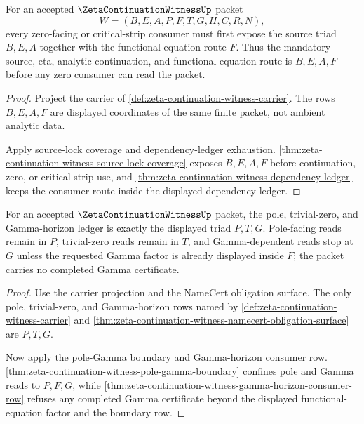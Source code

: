 \begin{theorem}
\label{thm:zeta-continuation-witness-source-lock-triad}
For an accepted $\ZetaContinuationWitnessUp$ packet
$$
W=(B,E,A,P,F,T,G,H,C,R,N),
$$
every zero-facing or critical-strip consumer must first expose the source triad $B,E,A$ together with the functional-equation route $F$. Thus the mandatory source, eta, analytic-continuation, and functional-equation route is $B,E,A,F$ before any zero consumer can read the packet.
\end{theorem}
\begin{proof}
Project the carrier of \autoref{def:zeta-continuation-witness-carrier}. The rows $B,E,A,F$ are displayed coordinates of the same finite packet, not ambient analytic data.

Apply source-lock coverage and dependency-ledger exhaustion. \autoref{thm:zeta-continuation-witness-source-lock-coverage} exposes $B,E,A,F$ before continuation, zero, or critical-strip use, and \autoref{thm:zeta-continuation-witness-dependency-ledger} keeps the consumer route inside the displayed dependency ledger.
\end{proof}

\begin{theorem}
\label{thm:zeta-continuation-witness-gamma-boundary-triad}
For an accepted $\ZetaContinuationWitnessUp$ packet, the pole, trivial-zero, and Gamma-horizon ledger is exactly the displayed triad $P,T,G$. Pole-facing reads remain in $P$, trivial-zero reads remain in $T$, and Gamma-dependent reads stop at $G$ unless the requested Gamma factor is already displayed inside $F$; the packet carries no completed Gamma certificate.
\end{theorem}
\begin{proof}
Use the carrier projection and the NameCert obligation surface. The only pole, trivial-zero, and Gamma-horizon rows named by \autoref{def:zeta-continuation-witness-carrier} and \autoref{thm:zeta-continuation-witness-namecert-obligation-surface} are $P,T,G$.

Now apply the pole-Gamma boundary and Gamma-horizon consumer row. \autoref{thm:zeta-continuation-witness-pole-gamma-boundary} confines pole and Gamma reads to $P,F,G$, while \autoref{thm:zeta-continuation-witness-gamma-horizon-consumer-row} refuses any completed Gamma certificate beyond the displayed functional-equation factor and the boundary row.
\end{proof}

